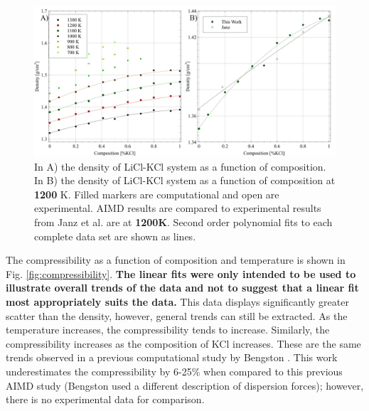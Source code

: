\documentclass[review]{elsarticle}
\providecommand{\DIFaddtex}[1]{{\bf #1}} %
\providecommand{\DIFdeltex}[1]{} %
\providecommand{\DIFaddbegin}{\protect\color{blue}} %
\providecommand{\DIFaddend}{\protect\color{black}} %
\providecommand{\DIFaddFL}[1]{\DIFadd{#1}} %
\providecommand{\DIFdelFL}[1]{\DIFdel{#1}} %
\providecommand{\DIFaddbeginFL}{} %
\providecommand{\DIFaddendFL}{} %
\providecommand{\DIFdelbeginFL}{} %
\providecommand{\DIFdelendFL}{} %
\providecommand{\DIFadd}[1]{\texorpdfstring{\DIFaddtex{#1}}{#1}} %
\providecommand{\DIFdel}[1]{\texorpdfstring{\DIFdeltex{#1}}{}} %
\newcommand{\DIFscaledelfig}{0.5}
\newlength{\DIFdelgraphicswidth} %
\newlength{\DIFdelgraphicsheight} %
\newcommand{\DIFaddincludegraphics}[2][]{{\color{blue}\fbox{\DIFOincludegraphics[#1]{#2}}}} %
\newcommand{\DIFdelincludegraphics}[2][]{%
\sbox{\DIFdelgraphicsbox}{\DIFOincludegraphics[#1]{#2}}%
\settoboxwidth{\DIFdelgraphicswidth}{\DIFdelgraphicsbox} %
\settoboxtotalheight{\DIFdelgraphicsheight}{\DIFdelgraphicsbox} %
\scalebox{\DIFscaledelfig}{%
\parbox[b]{\DIFdelgraphicswidth}{\usebox{\DIFdelgraphicsbox}\\[-\baselineskip] \rule{\DIFdelgraphicswidth}{0em}}\llap{\resizebox{\DIFdelgraphicswidth}{\DIFdelgraphicsheight}{%
\setlength{\unitlength}{\DIFdelgraphicswidth}%
\begin{picture}(1,1)%
\thicklines\linethickness{2pt} %
{\color[rgb]{1,0,0}\put(0,0){\framebox(1,1){}}}%
{\color[rgb]{1,0,0}\put(0,0){\line( 1,1){1}}}%
{\color[rgb]{1,0,0}\put(0,1){\line(1,-1){1}}}%
\end{picture}%
}\hspace*{3pt}}} %
} %
\DeclareRobustCommand{\DIFaddbegin}{\DIFOaddbegin \let\includegraphics\DIFaddincludegraphics} %
\DeclareRobustCommand{\DIFaddend}{\DIFOaddend \let\includegraphics\DIFOincludegraphics} %
\DeclareRobustCommand{\DIFaddbeginFL}{\DIFOaddbeginFL \let\includegraphics\DIFaddincludegraphics} %
\DeclareRobustCommand{\DIFaddendFL}{\DIFOaddendFL \let\includegraphics\DIFOincludegraphics} %
\DeclareRobustCommand{\DIFdelbeginFL}{\DIFOdelbeginFL \let\includegraphics\DIFdelincludegraphics} %
\DeclareRobustCommand{\DIFdelendFL}{\DIFOaddendFL \let\includegraphics\DIFOincludegraphics} %
\begin{document}
\begin{figure}[h]
 \centering
 \DIFdelbeginFL %
\DIFdelendFL \DIFaddbeginFL \includegraphics[width=1.0\textwidth]{images/denisty_combined_figures.jpg} 
 \DIFaddendFL \caption{In A) the density of LiCl-KCl system as a function of composition. In B) the density of LiCl-KCl system as a function of composition at \DIFdelbeginFL \DIFdelFL{1100 }\DIFdelendFL \DIFaddbeginFL \DIFaddFL{1200 }\DIFaddendFL K. Filled markers are computational and open are experimental. AIMD results are compared to \DIFdelbeginFL \DIFdelFL{classical molecular dynamics and }\DIFdelendFL experimental results from \DIFdelbeginFL \DIFdelFL{Wang et al. \cite{Wang2015}, and experimental results from }\DIFdelendFL Janz et al. \DIFdelbeginFL \DIFdelFL{\cite{Janz1988} }\DIFdelendFL \DIFaddbeginFL \DIFaddFL{\cite{janz1975molten,van1955electrical} }\DIFaddendFL are at \DIFdelbeginFL \DIFdelFL{1100K}\DIFdelendFL \DIFaddbeginFL \DIFaddFL{1200K}\DIFaddendFL . Second order polynomial fits to each complete data set are shown as lines.}
 \label{fig:density}
\end{figure} 


\FloatBarrier

The compressibility as a function of composition and temperature is shown in Fig. \ref{fig:compressibility}. \DIFaddbegin \DIFadd{The linear fits were only intended to be used to illustrate overall trends of the data and not to suggest that a linear fit most appropriately suits the data. }\DIFaddend This data displays significantly greater scatter than the density, however, general trends can still be extracted. As the temperature increases, the compressibility tends to increase. Similarly, the compressibility increases as the composition of KCl increases. These are the same trends observed in a previous computational study by Bengston \cite{Bengston2014}. This work underestimates the compressibility by 6-25\% when compared to this previous AIMD study (Bengston used a different description of dispersion forces); however, there is no experimental data for comparison.
\end{document}
